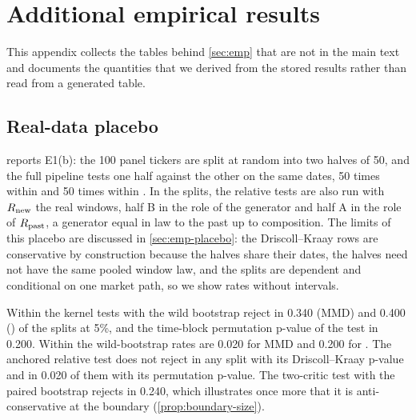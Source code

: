 \section{Additional empirical results}\label{app:emp}

This appendix collects the tables behind \cref{sec:emp} that are not in the main text and
documents the quantities that we derived from the stored results rather than read from a
generated table.

\subsection{Real-data placebo}\label{app:emp-real}

 reports E1(b): the 100 panel tickers are split at random into two halves
of 50, and the full pipeline tests one half against the other on the same dates, 50 times within
\TEST{} and 50 times within \TRAIN{}. In the \TRAIN{} splits, the relative tests are also run with
$R_{\mathrm{new}}$ the real \TEST{} windows, half B in the role of the generator and half A in the role of
$R_{\mathrm{past}}$, a generator equal in law to the past up to composition. The limits of this placebo are
discussed in \cref{sec:emp-placebo}: the Driscoll--Kraay rows are conservative by construction
because the halves share their dates, the halves need not have the same pooled window law, and
the splits are dependent and conditional on one market path, so we show rates without intervals.

Within \TEST{} the kernel tests with the wild bootstrap reject in 0.340 (MMD) and 0.400
(\SigMMD{}) of the splits at 5\%, and the time-block permutation p-value of the \WC{} test in
0.200. Within \TRAIN{} the wild-bootstrap rates are 0.020 for MMD and 0.200 for \SigMMD{}. The
anchored relative test does not reject in any \TRAIN{} split with its Driscoll--Kraay p-value and
in 0.020 of them with its permutation p-value. The two-critic test with the paired bootstrap
rejects in 0.240, which illustrates once more that it is anti-conservative at the boundary
(\cref{prop:boundary-size}).

